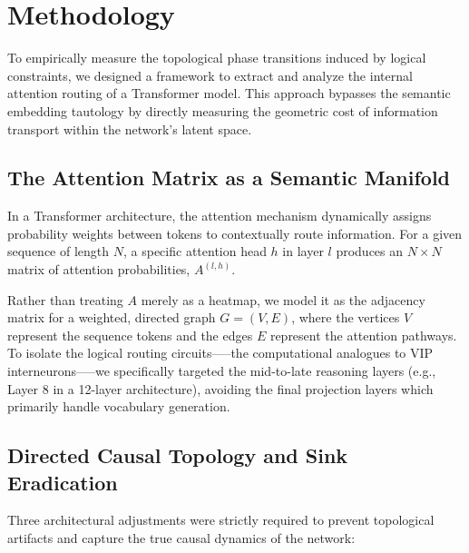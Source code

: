 \documentclass[11pt, a4paper]{article}
\begin{document}
\section{Methodology}

To empirically measure the topological phase transitions induced by logical constraints, we designed a framework to extract and analyze the internal attention routing of a Transformer model. This approach bypasses the semantic embedding tautology by directly measuring the geometric cost of information transport within the network's latent space.

\subsection{The Attention Matrix as a Semantic Manifold}
In a Transformer architecture, the attention mechanism dynamically assigns probability weights between tokens to contextually route information. For a given sequence of length $N$, a specific attention head $h$ in layer $l$ produces an $N \times N$ matrix of attention probabilities, $A^{(l,h)}$.

Rather than treating $A$ merely as a heatmap, we model it as the adjacency matrix for a weighted, directed graph $G = (V, E)$, where the vertices $V$ represent the sequence tokens and the edges $E$ represent the attention pathways. To isolate the logical routing circuits—--the computational analogues to VIP interneurons—--we specifically targeted the mid-to-late reasoning layers (e.g., Layer 8 in a 12-layer architecture), avoiding the final projection layers which primarily handle vocabulary generation.

\subsection{Directed Causal Topology and Sink Eradication}
Three architectural adjustments were strictly required to prevent topological artifacts and capture the true causal dynamics of the network:
\end{document}
